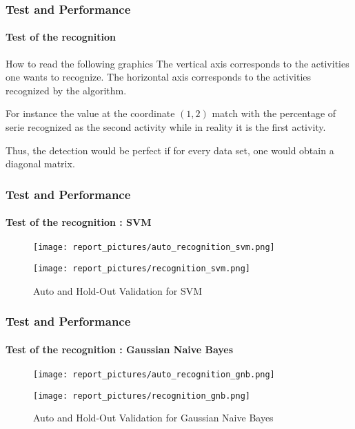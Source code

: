 \documentclass[11pt, sans, handout]{beamer}
\begin{document}
\begin{frame}
	\frametitle{Test and Performance}
	\framesubtitle{Test of the recognition}
	
	\begin{exampleblock}{How to read the following graphics}
	The vertical axis corresponds to the activities one wants to recognize. The horizontal axis corresponds to the activities recognized by the algorithm.
	
	For instance the value at the coordinate $(1,2)$ match with the percentage of serie recognized as the second activity while in reality it is the first activity. 
	
	Thus, the detection would be perfect if for every data set, one would obtain a diagonal matrix.
	\end{exampleblock}
\end{frame}

\begin{frame}
	\frametitle{Test and Performance}
	\framesubtitle{Test of the recognition : SVM}
			
	\begin{figure}[H]
			\begin{minipage}[c]{.46\linewidth}
      			\texttt{[image: report\_pictures/auto\_recognition\_svm.png]}
  			\end{minipage} \hfill
   			\begin{minipage}[c]{.46\linewidth}
      			\texttt{[image: report\_pictures/recognition\_svm.png]}
   			\end{minipage}
		\caption{Auto and Hold-Out Validation for SVM}
		\label{svm}
	\end{figure}
	
\end{frame}

\begin{frame}
	\frametitle{Test and Performance}
	\framesubtitle{Test of the recognition : Gaussian Naive Bayes}
			
	\begin{figure}[H]
			\begin{minipage}[c]{.46\linewidth}
      			\texttt{[image: report\_pictures/auto\_recognition\_gnb.png]}
  			\end{minipage} \hfill
   			\begin{minipage}[c]{.46\linewidth}
      			\texttt{[image: report\_pictures/recognition\_gnb.png]}
   			\end{minipage}
		\caption{Auto and Hold-Out Validation for Gaussian Naive Bayes}
		\label{gnb}
	\end{figure}
	
\end{frame}
\end{document}
